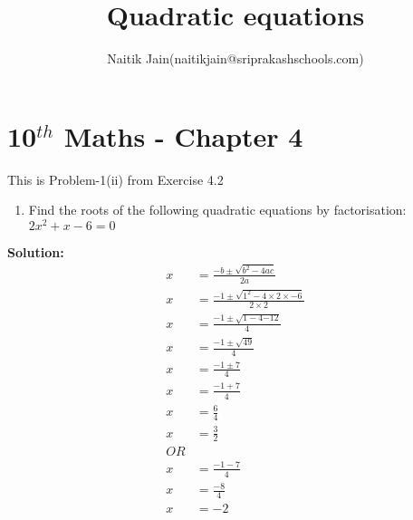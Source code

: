 \documentclass[12pt]{article}
\title{Quadratic equations}
\author{Naitik Jain(naitikjain@sriprakashschools.com)}
\newcommand{\solution}{\noindent \textbf{Solution: }}
\begin{document}
\maketitle
\section*{10$^{th}$ Maths - Chapter 4}
This is Problem-1(ii) from Exercise 4.2\\
\begin{enumerate}
    \item Find the roots of the following quadratic equations by factorisation:\\
${{2}x^2+ {x} -{6} }= 0$
\end{enumerate}

\solution
\begin{align}
x&=\frac{-b\pm\sqrt{b^2-4ac}}{2a}\\
x&=\frac{-1\pm\sqrt{1^2-4 \times 2\times -6}}{2 \times 2}\\
x&=\frac{-1\pm\sqrt{1-{4}{-12}}}{4}\\
x&=\frac{-1\pm\sqrt{49}}{4}\\
x&=\frac{-1\pm{7}}{4}\\
x&=\frac{-1+7}{4}\\
x&=\frac{6}{4}\\
x&=\frac{3}{2}\\
OR\\
x&=\frac{-1-7}{4}\\
x&=\frac{-8}{4}\\
x&=-2
\end{align}
\end{document}
